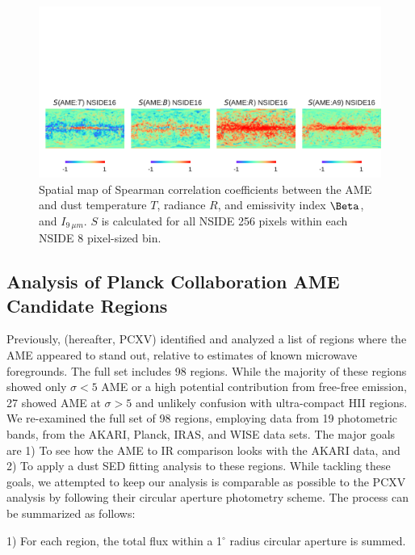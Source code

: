 \documentclass[preprint2,longabstract]{aastex}
\begin{document}
      \begin{figure}
        \label{fig:Spearman_Map_nside16_AMEtoMBBandA9}
        \includegraphics[width=160mm]{../Plots/Spearman_Map_nside16_AMEtoMBBandA9.pdf}
        \centering
        \caption{Spatial map of Spearman correlation coefficients between the AME and dust temperature $T$, radiance $R$, and emissivity index $\Beta$, and $I_{9~\mu{}m}.$ $S$ is calculated for all NSIDE 256 pixels within each NSIDE 8 pixel-sized bin.  }
      \end{figure}



\subsection{Analysis of Planck Collaboration AME Candidate Regions}

     Previously, \cite{planckXV} (hereafter, PCXV) identified and analyzed a list of regions where the AME appeared to stand out, relative to estimates of known microwave foregrounds. The full set includes 98 regions. While the majority of these regions showed only $\sigma{} < 5$ AME or a high potential contribution from free-free emission, 27 showed AME at $\sigma{} > 5$ and unlikely confusion with ultra-compact HII regions. We re-examined the full set of 98 regions, employing data from 19 photometric bands, from the AKARI, Planck, IRAS, and WISE data sets. The major goals are 1) To see how the AME to IR comparison looks with the AKARI data, and 2) To apply a dust SED fitting analysis to these regions. While tackling these goals, we attempted to keep our analysis is comparable as possible to the PCXV analysis by following their circular aperture photometry scheme. The process can be summarized as follows:

     1) For each region, the total flux within a 1$^{\circ}$ radius circular aperture is summed.
\end{document}
